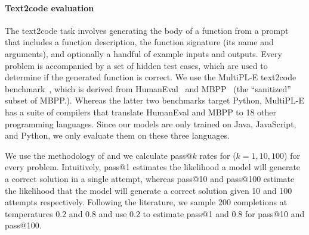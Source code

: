 \documentclass[10pt]{article} \usepackage{iclr2023_conference,times}
\begin{document}
\paragraph{Text2code evaluation}

The text2code task involves generating the body of a function from a prompt that includes a function description, the function signature (its name and arguments), and optionally a handful of example inputs and outputs.
Every problem is accompanied by a set of hidden test cases, which are used to determine if the generated function is correct.
We use the MultiPL-E text2code benchmark~\cite{cassano2022multiple}, which is derived from HumanEval~\cite{chen2021codex} and MBPP~\cite{austin2021program} (the ``sanitized'' subset of MBPP.). Whereas the latter two benchmarks target Python, MultiPL-E has a suite of compilers that translate HumanEval and MBPP to 18 other programming languages. Since our models are only trained on Java, JavaScript, and Python, we only evaluate them on these three languages.

We use the methodology of \citet{chen2021codex} and we calculate pass@$k$ rates for ($k = 1, 10, 100$) for every problem.
Intuitively, pass@1 estimates the likelihood a model will generate a correct solution in a single attempt, whereas pass@10 and pass@100 estimate the likelihood that the model will generate a correct solution given 10 and 100 attempts respectively.
Following the literature, we sample 200 completions at temperatures 0.2 and 0.8 and use 0.2 to estimate pass@1 and 0.8 for pass@10 and pass@100.
\end{document}
